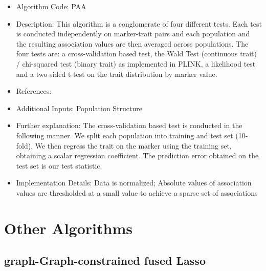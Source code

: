 \documentclass{article}
\begin{document}
\begin{itemize}
\item Algorithm Code: PAA
\item Description: This algorithm is a conglomerate of four different tests. Each test is conducted independently on marker-trait pairs and each population and the resulting association values are then averaged across populations. The four tests are: a cross-validation based test, the Wald Test (continuous trait) / chi-squared test (binary trait) as implemented in PLINK, a likelihood test and a two-sided t-test on the trait distribution by marker value.
\item References: \cite{PopAnal} \cite{PLINK} \cite{LikelihoodTest}
\item Additional Inputs: Population Structure
\item Further explanation: The cross-validation based test is conducted in the following manner. We split each population into training and test set (10-fold). We then regress the trait on the marker using the training set, obtaining a scalar regression coefficient. The prediction error obtained on the test set is our test statistic.
\item Implementation Details: Data is normalized; Absolute values of association values are thresholded at a small value to achieve a sparse set of associations
\end{itemize}


\section{Other Algorithms}

\subsection{graph-Graph-constrained fused Lasso}
\end{document}
